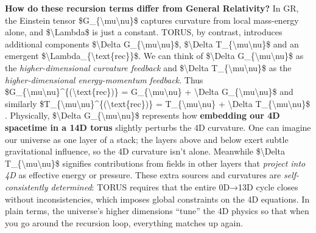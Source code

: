 \documentclass[]{article}
\begin{document}
\textbf{How do these recursion terms differ from General Relativity?} In
GR, the Einstein tensor \$G\_\{\textbackslash{}mu\textbackslash{}nu\}\$
captures curvature from local mass-energy alone, and
\$\textbackslash{}Lambda\$ is just a constant. TORUS, by contrast,
introduces additional components \$\textbackslash{}Delta
G\_\{\textbackslash{}mu\textbackslash{}nu\}\$, \$\textbackslash{}Delta
T\_\{\textbackslash{}mu\textbackslash{}nu\}\$ and an emergent
\$\textbackslash{}Lambda\_\{\textbackslash{}text\{rec\}\}\$. We can
think of \$\textbackslash{}Delta
G\_\{\textbackslash{}mu\textbackslash{}nu\}\$ as the
\emph{higher-dimensional curvature feedback} and \$\textbackslash{}Delta
T\_\{\textbackslash{}mu\textbackslash{}nu\}\$ as the
\emph{higher-dimensional energy-momentum feedback}. Thus
\$G\_\{\textbackslash{}mu\textbackslash{}nu\}\^{}\{(\textbackslash{}text\{rec\})\}
= G\_\{\textbackslash{}mu\textbackslash{}nu\} + \textbackslash{}Delta
G\_\{\textbackslash{}mu\textbackslash{}nu\}\$ and similarly
\$T\_\{\textbackslash{}mu\textbackslash{}nu\}\^{}\{(\textbackslash{}text\{rec\})\}
= T\_\{\textbackslash{}mu\textbackslash{}nu\} + \textbackslash{}Delta
T\_\{\textbackslash{}mu\textbackslash{}nu\}\$​. Physically,
\$\textbackslash{}Delta G\_\{\textbackslash{}mu\textbackslash{}nu\}\$
represents how \textbf{embedding our 4D spacetime in a 14D torus}
slightly perturbs the 4D curvature. One can imagine our universe as one
layer of a stack; the layers above and below exert subtle gravitational
influence, so the 4D curvature isn't alone​. Meanwhile
\$\textbackslash{}Delta T\_\{\textbackslash{}mu\textbackslash{}nu\}\$
signifies contributions from fields in other layers that \emph{project
into 4D} as effective energy or pressure​. These extra sources and
curvatures are \emph{self-consistently determined}: TORUS requires that
the entire 0D→13D cycle closes without inconsistencies, which imposes
global constraints on the 4D equations​. In plain terms, the universe's
higher dimensions ``tune'' the 4D physics so that when you go around the
recursion loop, everything matches up again.
\end{document}
